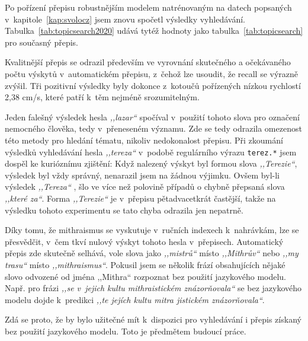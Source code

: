 Po pořízení přepisu robustnějším modelem natrénovaným na datech popsaných
v~kapitole~\ref{kap:svolocz} jsem znovu spočetl výsledky vyhledávání.
Tabulka~\ref{tab:topicsearch2020} udává tytéž hodnoty jako tabulka~\ref{tab:topicsearch} pro současný přepis.

Kvalitnější přepis se odrazil především ve vyrovnání skutečného a očekávaného
počtu výskytů v~automatickém přepisu, z~čehož lze usoudit, že recall se výrazně
zvýšil. Tři pozitivní výsledky byly dokonce z~kotoučů pořízených nízkou
rychlostí 2,38 cm/s, které patří k~těm nejméně srozumitelným.

Jeden falešný
výsledek hesla {\em ,,lazar``} spočíval v~použití tohoto slova pro označení
nemocného člověka, tedy v~přeneseném významu. Zde se tedy odrazila omezenost
této metody pro hledání tématu, nikoliv nedokonalost přepisu. Při zkoumání
výsledků vyhledávání hesla {\em ,,tereza``} v~podobě regulárního výrazu
\texttt{terez.*} jsem dospěl ke kurióznímu zjištění: Když nalezený výskyt byl
formou slova {\em ,,Terezie``}, výsledek byl vždy správný, nenarazil jsem na žádnou
výjimku. Ovšem byl-li výsledek {\em ,,Tereza`` }, šlo ve více než polovině případů o
chybně přepsaná slova {\em ,,které za``}. Forma {\em ,,Terezie``} je v~přepisu
pětadvacetkrát častější, takže na výsledku tohoto experimentu se tato chyba
odrazila jen nepatrně.

Díky tomu, že mithraismus se vyskutuje v~ručních indexech k~nahrávkám, lze se
přesvědčit, v~čem tkví nulový výskyt tohoto hesla v~přepisech. Automatický
přepis zde skutečně selhává, vole slova jako {\em ,,mistrů``} místo {\em
,,Mithrův``} nebo {\em ,,my trasu``} místo {\em ,,mithraismus``}. Pokusil jsem
se několik frází obsahujících nějaké slovo odvozené od jména ,,Mithra``
rozpoznat bez použití jazykového modelu. Např. pro frázi {\em ,,se v~jejich
kultu mithraistickém znázorňovala``} se bez jazykového modelu dojde k~predikci
{\em ,,te jejích kultu mitra jistickém znázorňovala``}.

Zdá se proto, že by bylo užitečné mít k~dispozici pro vyhledávání i přepis
získaný bez použití jazykového modelu. Toto je předmětem budoucí práce.


